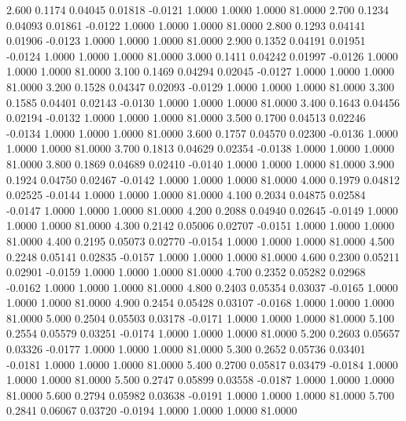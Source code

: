    2.600   0.1174   0.04045   0.01818  -0.0121   1.0000   1.0000   1.0000  81.0000
   2.700   0.1234   0.04093   0.01861  -0.0122   1.0000   1.0000   1.0000  81.0000
   2.800   0.1293   0.04141   0.01906  -0.0123   1.0000   1.0000   1.0000  81.0000
   2.900   0.1352   0.04191   0.01951  -0.0124   1.0000   1.0000   1.0000  81.0000
   3.000   0.1411   0.04242   0.01997  -0.0126   1.0000   1.0000   1.0000  81.0000
   3.100   0.1469   0.04294   0.02045  -0.0127   1.0000   1.0000   1.0000  81.0000
   3.200   0.1528   0.04347   0.02093  -0.0129   1.0000   1.0000   1.0000  81.0000
   3.300   0.1585   0.04401   0.02143  -0.0130   1.0000   1.0000   1.0000  81.0000
   3.400   0.1643   0.04456   0.02194  -0.0132   1.0000   1.0000   1.0000  81.0000
   3.500   0.1700   0.04513   0.02246  -0.0134   1.0000   1.0000   1.0000  81.0000
   3.600   0.1757   0.04570   0.02300  -0.0136   1.0000   1.0000   1.0000  81.0000
   3.700   0.1813   0.04629   0.02354  -0.0138   1.0000   1.0000   1.0000  81.0000
   3.800   0.1869   0.04689   0.02410  -0.0140   1.0000   1.0000   1.0000  81.0000
   3.900   0.1924   0.04750   0.02467  -0.0142   1.0000   1.0000   1.0000  81.0000
   4.000   0.1979   0.04812   0.02525  -0.0144   1.0000   1.0000   1.0000  81.0000
   4.100   0.2034   0.04875   0.02584  -0.0147   1.0000   1.0000   1.0000  81.0000
   4.200   0.2088   0.04940   0.02645  -0.0149   1.0000   1.0000   1.0000  81.0000
   4.300   0.2142   0.05006   0.02707  -0.0151   1.0000   1.0000   1.0000  81.0000
   4.400   0.2195   0.05073   0.02770  -0.0154   1.0000   1.0000   1.0000  81.0000
   4.500   0.2248   0.05141   0.02835  -0.0157   1.0000   1.0000   1.0000  81.0000
   4.600   0.2300   0.05211   0.02901  -0.0159   1.0000   1.0000   1.0000  81.0000
   4.700   0.2352   0.05282   0.02968  -0.0162   1.0000   1.0000   1.0000  81.0000
   4.800   0.2403   0.05354   0.03037  -0.0165   1.0000   1.0000   1.0000  81.0000
   4.900   0.2454   0.05428   0.03107  -0.0168   1.0000   1.0000   1.0000  81.0000
   5.000   0.2504   0.05503   0.03178  -0.0171   1.0000   1.0000   1.0000  81.0000
   5.100   0.2554   0.05579   0.03251  -0.0174   1.0000   1.0000   1.0000  81.0000
   5.200   0.2603   0.05657   0.03326  -0.0177   1.0000   1.0000   1.0000  81.0000
   5.300   0.2652   0.05736   0.03401  -0.0181   1.0000   1.0000   1.0000  81.0000
   5.400   0.2700   0.05817   0.03479  -0.0184   1.0000   1.0000   1.0000  81.0000
   5.500   0.2747   0.05899   0.03558  -0.0187   1.0000   1.0000   1.0000  81.0000
   5.600   0.2794   0.05982   0.03638  -0.0191   1.0000   1.0000   1.0000  81.0000
   5.700   0.2841   0.06067   0.03720  -0.0194   1.0000   1.0000   1.0000  81.0000
